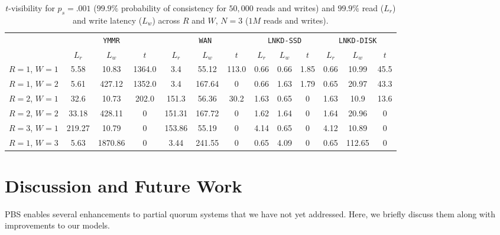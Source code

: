 \documentclass{vldb}
\begin{document}
\begin{table}
\centering
\begin{tabular}{c|c|c|c|c|c|c|c|c|c|c|c|c|}
\cline{2-13}
& \multicolumn{3}{|c|}{\texttt{YMMR}} & \multicolumn{3}{|c|}{\texttt{WAN}} & \multicolumn{3}{|c|}{\texttt{LNKD-SSD}} & \multicolumn{3}{|c|}{\texttt{LNKD-DISK}}\\
&\multicolumn{1}{|c}{$L_r$}  & \multicolumn{1}{c}{$L_w$} & \multicolumn{1}{c|}{$t$} &  \multicolumn{1}{|c}{$L_r$} & \multicolumn{1}{c}{$L_w$} & \multicolumn{1}{c|}{$t$} &  \multicolumn{1}{|c}{$L_r$} & \multicolumn{1}{c}{$L_w$} & \multicolumn{1}{c|}{$t$} &  \multicolumn{1}{|c}{$L_r$} & \multicolumn{1}{c}{$L_w$} & \multicolumn{1}{c|}{$t$} \\\hline
\multicolumn{1}{|c|}{$R$$=$$1$, $W$$=$$1$}
& 5.58 & 10.83 & 1364.0 & 3.4 & 55.12 & 113.0 & 0.66 & 0.66 & 1.85 & 0.66 & 10.99 & 45.5 \\
\multicolumn{1}{|c|}{$R$$=$$1$, $W$$=$$2$}
& 5.61 & 427.12 & 1352.0 & 3.4 & 167.64 & 0 & 0.66 & 1.63 & 1.79 & 0.65 & 20.97 & 43.3 \\
\multicolumn{1}{|c|}{$R$$=$$2$, $W$$=$$1$}
& 32.6 & 10.73 & 202.0 & 151.3 & 56.36 & 30.2 & 1.63 & 0.65 & 0 & 1.63 & 10.9 & 13.6 \\
\multicolumn{1}{|c|}{$R$$=$$2$, $W$$=$$2$}
& 33.18 & 428.11 & 0 & 151.31 & 167.72 & 0 & 1.62 & 1.64 & 0 & 1.64 & 20.96 & 0 \\
\multicolumn{1}{|c|}{$R$$=$$3$, $W$$=$$1$}
& 219.27 & 10.79 & 0 & 153.86 & 55.19 & 0 & 4.14 & 0.65 & 0 & 4.12 & 10.89 & 0 \\
\multicolumn{1}{|c|}{$R$$=$$1$, $W$$=$$3$}
& 5.63 & 1870.86 & 0 & 3.44 & 241.55 & 0 & 0.65 & 4.09 & 0 & 0.65 & 112.65 & 0 \\
\hline
\end{tabular}
\caption{$t$-visibility for $p_{s} = .001$ ($99.9\%$ probability
  of consistency for $50,000$ reads and writes) and $99.9\%$ read
  ($L_r$) and write latency ($L_w$) across $R$ and $W$, $N$$=$$3$
  ($1M$ reads and writes).}
\label{table:lat-stale}
\end{table}


\section{Discussion and Future Work}
\label{sec:discussion}

PBS enables several enhancements to partial quorum systems that we
have not yet addressed.  Here, we briefly discuss them along with
improvements to our models.
\end{document}
